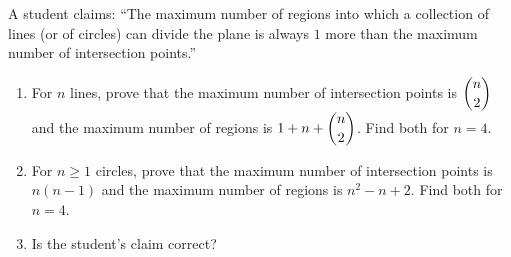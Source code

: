 A student claims: ``The maximum number of regions into which a collection of lines (or of circles) can divide the plane is always $1$ more than the maximum number of intersection points.''
\begin{enumerate}
\item[(a)] For $n$ lines, prove that the maximum number of intersection points is $\dbinom n2$ and the maximum number of regions is $1+n+\dbinom n2$. Find both for $n=4$.
\item[(b)] For $n\ge1$ circles, prove that the maximum number of intersection points is $n(n-1)$ and the maximum number of regions is $n^2-n+2$. Find both for $n=4$.
\item[(c)] Is the student's claim correct?
\end{enumerate}

